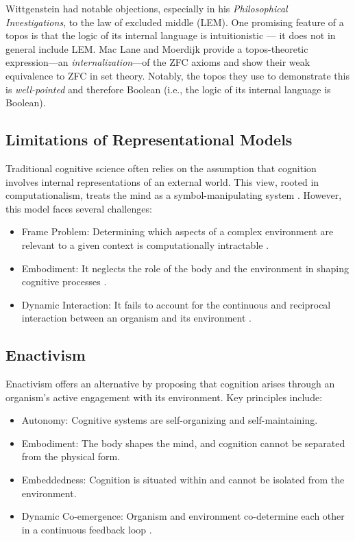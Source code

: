 \documentclass{article}
\begin{document}
Wittgenstein had notable objections, especially in his \emph{Philosophical Investigations}, to the law of excluded middle (LEM). One promising feature of a topos is that the logic of its internal language is intuitionistic --- it does not in general include LEM. Mac Lane and Moerdijk provide a topos-theoretic expression---an \emph{internalization}---of the ZFC axioms and show their weak equivalence to ZFC in set theory. Notably, the topos they use to demonstrate this is \emph{well-pointed} and therefore Boolean (i.e., the logic of its internal language is Boolean).

\subsection{Limitations of Representational Models}

Traditional cognitive science often relies on the assumption that cognition involves internal representations of an external world. This view, rooted in computationalism, treats the mind as a symbol-manipulating system \cite{fodor1980}. However, this model faces several challenges:

\begin{itemize} 
\item Frame Problem: Determining which aspects of a complex environment are relevant to a given context is computationally intractable \cite{pylyshyn1987}. 
\item Embodiment: It neglects the role of the body and the environment in shaping cognitive processes \cite{clark1997}. 
\item Dynamic Interaction: It fails to account for the continuous and reciprocal interaction between an organism and its environment \cite{thompson2007}. 
\end{itemize}

\subsection{Enactivism}

Enactivism offers an alternative by proposing that cognition arises through an organism's active engagement with its environment. Key principles include:

\begin{itemize} \item Autonomy: Cognitive systems are self-organizing and self-maintaining. \item Embodiment: The body shapes the mind, and cognition cannot be separated from the physical form. \item Embeddedness: Cognition is situated within and cannot be isolated from the environment. \item Dynamic Co-emergence: Organism and environment co-determine each other in a continuous feedback loop \cite{varela1991}. \end{itemize}
\end{document}
